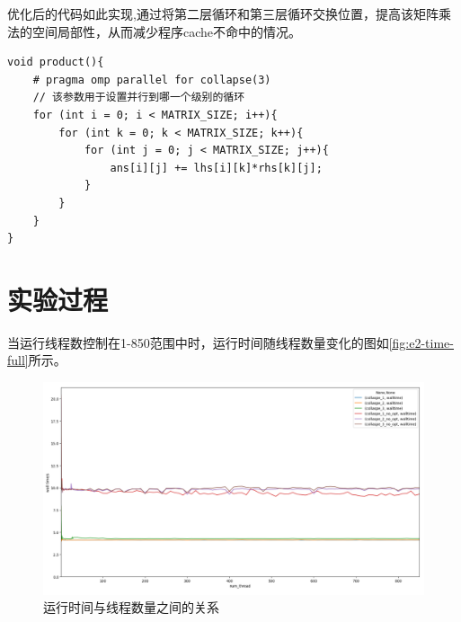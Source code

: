 \documentclass[forprint]{myreport}
\begin{document}
优化后的代码如此实现,通过将第二层循环和第三层循环交换位置，提高该矩阵乘法的空间局部性，从而减少程序cache不命中的情况。

\begin{lstlisting}[style = c++]
void product(){
    # pragma omp parallel for collapse(3)
    // 该参数用于设置并行到哪一个级别的循环
    for (int i = 0; i < MATRIX_SIZE; i++){
        for (int k = 0; k < MATRIX_SIZE; k++){
            for (int j = 0; j < MATRIX_SIZE; j++){
                ans[i][j] += lhs[i][k]*rhs[k][j];
            }
        }
    }
}   
\end{lstlisting}

\section{实验过程}

当运行线程数控制在1-850范围中时，运行时间随线程数量变化的图如\autoref{fig:e2-time-full}所示。

\begin{figure}[htp]
    \centering
    \includegraphics[width=15cm]{"../figure/2018-05-06-16-51-58.png"}
    \caption{运行时间与线程数量之间的关系}
    \label{fig:e2-time-full}
\end{figure}
\end{document}
